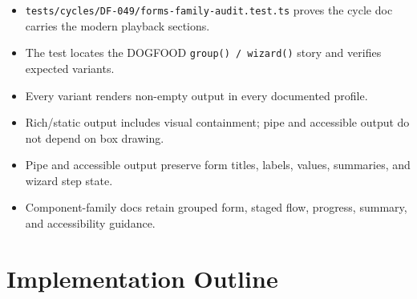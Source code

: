 \begin{itemize}
\tightlist
\item
  \texttt{t\allowbreak{}e\allowbreak{}s\allowbreak{}t\allowbreak{}s\allowbreak{}/\allowbreak{}c\allowbreak{}y\allowbreak{}c\allowbreak{}l\allowbreak{}e\allowbreak{}s\allowbreak{}/\allowbreak{}D\allowbreak{}F\allowbreak{}-\allowbreak{}0\allowbreak{}4\allowbreak{}9\allowbreak{}/\allowbreak{}f\allowbreak{}o\allowbreak{}r\allowbreak{}m\allowbreak{}s\allowbreak{}-\allowbreak{}f\allowbreak{}a\allowbreak{}m\allowbreak{}i\allowbreak{}l\allowbreak{}y\allowbreak{}-\allowbreak{}a\allowbreak{}u\allowbreak{}d\allowbreak{}i\allowbreak{}t\allowbreak{}.\allowbreak{}t\allowbreak{}e\allowbreak{}s\allowbreak{}t\allowbreak{}.\allowbreak{}t\allowbreak{}s} proves the cycle doc carries the modern playback sections.
\item
  The test locates the DOGFOOD \texttt{g\allowbreak{}r\allowbreak{}o\allowbreak{}u\allowbreak{}p\allowbreak{}(\allowbreak{})\allowbreak{} \allowbreak{}/\allowbreak{} \allowbreak{}w\allowbreak{}i\allowbreak{}z\allowbreak{}a\allowbreak{}r\allowbreak{}d\allowbreak{}(\allowbreak{})} story and verifies expected variants.
\item
  Every variant renders non-empty output in every documented profile.
\item
  Rich/static output includes visual containment; pipe and accessible output do not depend on box drawing.
\item
  Pipe and accessible output preserve form titles, labels, values, summaries, and wizard step state.
\item
  Component-family docs retain grouped form, staged flow, progress, summary, and accessibility guidance.
\end{itemize}

\section{Implementation Outline}\label{record-097-implementation-outline}

